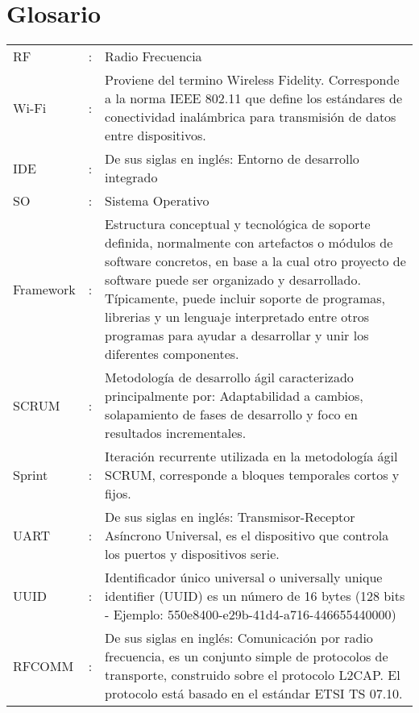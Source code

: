 

\section*{Glosario}

\begin{tabular}{lcp{10.5cm}}
RF &:& Radio Frecuencia\\
	
Wi-Fi &:& Proviene del termino Wireless Fidelity. Corresponde a la norma IEEE 802.11
que define los estándares de conectividad inalámbrica para transmisión de datos entre dispositivos.\\

IDE &:& De sus siglas en inglés: Entorno de desarrollo integrado\\

SO &:& Sistema Operativo\\

Framework &:& Estructura conceptual y tecnológica de soporte definida, normalmente con artefactos o módulos de software concretos, en base a la cual otro proyecto de software puede ser organizado y desarrollado. Típicamente, puede incluir soporte de programas, librerias y un lenguaje interpretado entre otros programas para ayudar a desarrollar y unir los diferentes componentes.\\

SCRUM &:& Metodología de desarrollo ágil caracterizado principalmente por: Adaptabilidad a cambios, solapamiento de fases de desarrollo y foco en resultados incrementales.\\

Sprint &:& Iteración recurrente utilizada en la metodología ágil SCRUM, corresponde a bloques temporales cortos y fijos.\\

UART &:& De sus siglas en inglés: Transmisor-Receptor Asíncrono Universal, es el dispositivo que controla los puertos y dispositivos serie.\\

UUID &:& Identificador único universal o universally unique identifier (UUID) es un número de 16 bytes (128 bits - Ejemplo: 550e8400-e29b-41d4-a716-446655440000)\\

RFCOMM &:& De sus siglas en inglés: Comunicación por radio frecuencia, es un conjunto simple de protocolos de transporte, construido sobre el protocolo L2CAP. El protocolo está basado en el estándar ETSI TS 07.10.\\

\end{tabular}

